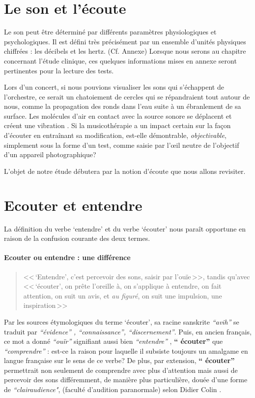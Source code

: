 
\section{Le son et l'écoute}
Le son peut être déterminé par différents paramètres
physiologiques et psychologiques.
Il est défini très précisément par un ensemble d'unités physiques chiffrées
: les décibels  et les hertz. (Cf. Annexe)
Lorsque nous serons au chapitre concernant l'étude clinique,
ces quelques informations mises en annexe seront pertinentes pour la lecture des tests.

Lors d'un concert, si nous pouvions visualiser les sons qui
s'échappent de l'orchestre, ce serait un chatoiement de cercles qui se
répandraient tout autour de nous, comme
la propagation des
ronds dans l'eau suite à un ébranlement de sa surface.
Les molécules d'air en contact avec la source sonore se déplacent et
créent une vibration \autocite {bencivelli:pourquoi,}.
Si la
musicothérapie a un impact certain sur la façon d'écouter en
entraînant sa
modification, est-elle démontrable, \textsl{objectivable},
simplement sous la forme d'un test, comme saisie par
l'\oe il neutre de l'objectif d'un appareil
photographique?

L'objet de notre étude débutera par la notion d'écoute que nous allons revisiter.
\section{Ecouter et entendre}
La définition du verbe `entendre' et du verbe `écouter'
nous paraît opportune
en raison de la confusion courante des deux termes.
\paragraph{Ecouter ou entendre : une différence}
\begin{quote}<<\,`Entendre', c'est  percevoir des sons, saisir par l'ouïe\,>>, tandis qu'avec
<<\,`écouter', on prête l'oreille à, on s'applique à entendre, on fait attention, on suit un avis, et \emph{au figuré}, on suit une impulsion, une inspiration\,>> \autocite[361--385]{hachette:dictionnaire} \end{quote}
Par les sources étymologiques du
terme `écouter',
 sa racine sanskrite \emph{ ``avih'' } se traduit par
 \emph{``évidence'' , ``connaissance'', ``discernement''}. Puis, en ancien
 français, ce mot a donné \textit{``ouïr''} signifiant aussi bien \textit{``entendre''} ,
\textbf{`` écouter'' } que \textit{``comprendre''} \autocite {etymologieWeb}:
 est-ce la raison
pour laquelle il subsiste toujours un amalgame en langue française
sur le sens de ce verbe?
De plus, par extension, \textbf{`` écouter'' }
permettrait non seulement de comprendre avec plus d'attention
mais aussi de percevoir des sons différemment, de manière plus particulière, douée d'une forme de
\textit{``clairaudience"}, (faculté d'audition paranormale) selon Didier
Colin \autocite {colin2015}.

